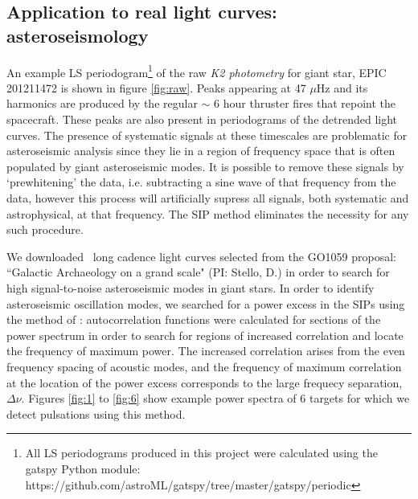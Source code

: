 \documentclass[useAMS, usenatbib, preprint, 12pt]{aastex}
\begin{document}
\subsection{Application to real light curves: asteroseismology}

An example LS periodogram\footnote{All LS periodograms
produced in this project were calculated using the gatspy Python module:
https://github.com/astroML/gatspy/tree/master/gatspy/periodic} of the raw {\it
K2 photometry} for giant star, EPIC 201211472 is shown in figure
\ref{fig:raw}.
Peaks appearing at 47 $\mu$Hz and its harmonics are produced by the regular
$\sim$ 6 hour thruster fires that repoint the spacecraft.
These peaks are also present in periodograms of the \citet{Vanderburg2014}
detrended light curves.
The presence of systematic signals at these timescales are problematic for
asteroseismic analysis since they lie in a region of frequency space
that is often populated by giant asteroseismic modes.
It is possible to remove these signals by `prewhitening' the data, i.e.
subtracting a sine wave of that frequency from the data, however this process
will artificially supress all signals, both systematic and astrophysical, at
that frequency.
The SIP method eliminates the necessity for any such procedure.

We downloaded \nGO\ long cadence light curves selected from the GO1059
proposal: ``Galactic Archaeology on a grand scale" (PI: Stello, D.) in order
to search for high signal-to-noise asteroseismic modes in giant stars.
In order to identify asteroseismic oscillation modes, we searched for a power
excess in the SIPs using the method of \citet{Huber2009}:
autocorrelation functions were calculated for sections of the power spectrum in
order to search for regions of increased correlation and locate the frequency
of maximum power.
The increased correlation arises from the even frequency spacing of acoustic
modes, and the frequency of maximum correlation at the location of the power
excess corresponds to the large frequecy separation, $\Delta\nu$.
Figures \ref{fig:1} to \ref{fig:6} show example power spectra of 6 targets for
which we detect pulsations using this method.

\end{document}
